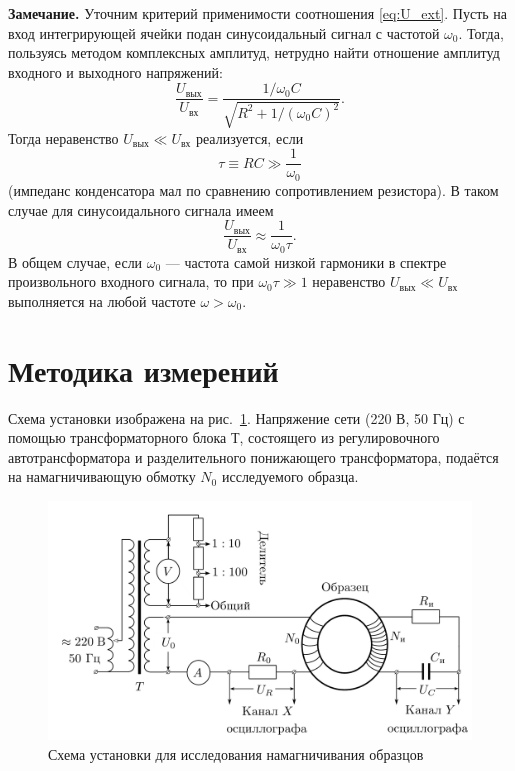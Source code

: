 \documentclass[a4paper, 12pt]{article}
\begin{document}
\textbf{Замечание.} Уточним критерий применимости соотношения \eqref{eq:U_ext}. Пусть на вход интегрирующей ячейки подан синусоидальный сигнал с частотой $\omega_0$. Тогда, пользуясь методом комплексных амплитуд, нетрудно найти отношение амплитуд входного и выходного напряжений:
\begin{equation}
\frac{U_{\text{вых}}}{U_{\text{вх}}}=\frac{1/\omega_0C}{\sqrt{R^2+1/(\omega_0C)^2}}.
\end{equation}
Тогда неравенство $U_{\text{вых}} \ll U_{\text{вх}}$ реализуется, если 
\begin{equation}
\tau \equiv RC\gg \frac{1}{\omega_0}
\end{equation}
(импеданс конденсатора мал по сравнению сопротивлением резистора).
В таком случае для синусоидального сигнала имеем
\begin{equation}
\frac{U_{\text{вых}}}{U_{\text{вх}}}\approx\frac{1}{\omega_0\tau}.
\end{equation}
В общем случае, если $\omega_0$ — частота самой низкой гармоники в спектре
произвольного входного сигнала, то при $\omega_0\tau \gg 1$ неравенство $U_{\text{вых}} \ll U_{\text{вх}}$ выполняется на любой частоте $\omega > \omega_0$.

\section{Методика измерений}

Схема установки изображена на рис.~\ref{fig:scheme}. Напряжение сети (220 В,
50 Гц) с помощью трансформаторного блока Т, состоящего из регулировочного автотрансформатора и разделительного понижающего трансформатора, подаётся на намагничивающую обмотку $N_0$ исследуемого образца.
\begin{figure}[h!]
	\centering
	\includegraphics[scale=2]{3.png}
	\caption{ Схема установки для исследования намагничивания образцов}
	\label{fig:scheme}
\end{figure}
\end{document}
